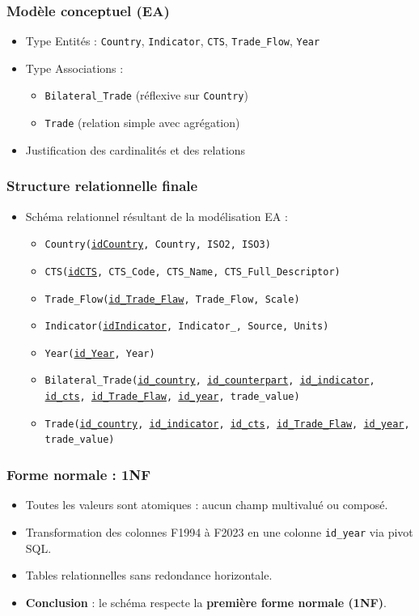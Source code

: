 \documentclass[11pt]{beamer}
\begin{document}
\begin{frame}
  \frametitle{Modèle conceptuel (EA)}
  \begin{itemize}
    \item<1-> Type Entités : \texttt{Country}, \texttt{Indicator}, \texttt{CTS}, \texttt{Trade\_Flow}, \texttt{Year}
    \item<2-> Type Associations : 
      \begin{itemize}
        \item \texttt{Bilateral\_Trade} (réflexive sur \texttt{Country})
        \item \texttt{Trade} (relation simple avec agrégation)
      \end{itemize}
    \item<3-> Justification des cardinalités et des relations
  \end{itemize}
\end{frame}

\begin{frame}
  \frametitle{Structure relationnelle finale}
  \begin{itemize}
    \item Schéma relationnel résultant de la modélisation EA :
    \begin{itemize}
      \item \texttt{Country(\underline{idCountry}, Country, ISO2, ISO3)}
      \item \texttt{CTS(\underline{idCTS}, CTS\_Code, CTS\_Name, CTS\_Full\_Descriptor)}
      \item \texttt{Trade\_Flow(\underline{id\_Trade\_Flaw}, Trade\_Flow, Scale)}
      \item \texttt{Indicator(\underline{idIndicator}, Indicator\_, Source, Units)}
      \item \texttt{Year(\underline{id\_Year}, Year)}
      \item \texttt{Bilateral\_Trade(\underline{id\_country}, \underline{id\_counterpart}, \underline{id\_indicator}, \underline{id\_cts}, \underline{id\_Trade\_Flaw}, \underline{id\_year}, trade\_value)}
      \item \texttt{Trade(\underline{id\_country}, \underline{id\_indicator}, \underline{id\_cts}, \underline{id\_Trade\_Flaw}, \underline{id\_year}, trade\_value)}
    \end{itemize}
  \end{itemize}
\end{frame}

\begin{frame}
  \frametitle{Forme normale : 1NF}
  \begin{itemize}
    \item Toutes les valeurs sont atomiques : aucun champ multivalué ou composé.
    \item Transformation des colonnes F1994 à F2023 en une colonne \texttt{id\_year} via pivot SQL.
    \item Tables relationnelles sans redondance horizontale.
    \item \textbf{Conclusion} : le schéma respecte la \textbf{première forme normale (1NF)}.
  \end{itemize}
\end{frame}
\end{document}
